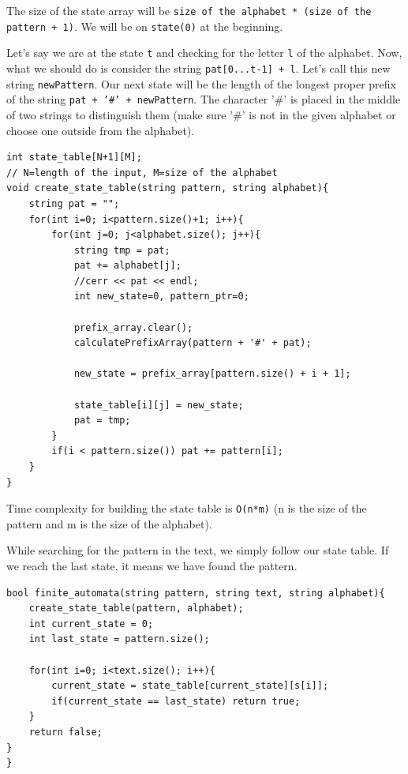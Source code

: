 \documentclass[12pt]{article}
\begin{document}
        The size of the state array will be \texttt{size of the alphabet * (size of the pattern + 1)}. We will be on \texttt{state(0)} at the beginning.
        
        Let's say we are at the state \texttt{t} and checking for the letter \texttt{l} of the alphabet. Now, what we should do is consider the string \texttt{pat[0...t-1] + l}. Let's call this new string \texttt{newPattern}. Our next state will be the length of the longest proper prefix of the string \texttt{pat + '#' + newPattern}. The character '#' is placed in the middle of two strings to distinguish them (make sure '#' is not in the given alphabet or choose one outside from the alphabet).
        
        \begin{verbatim}
int state_table[N+1][M];
// N=length of the input, M=size of the alphabet
void create_state_table(string pattern, string alphabet){
    string pat = "";
    for(int i=0; i<pattern.size()+1; i++){
        for(int j=0; j<alphabet.size(); j++){
            string tmp = pat;
            pat += alphabet[j];
            //cerr << pat << endl;
            int new_state=0, pattern_ptr=0;

            prefix_array.clear();
            calculatePrefixArray(pattern + '#' + pat);

            new_state = prefix_array[pattern.size() + i + 1];
            
            state_table[i][j] = new_state;
            pat = tmp;
        }
        if(i < pattern.size()) pat += pattern[i];
    }
}
        \end{verbatim}
        
        Time complexity for building the state table is \texttt{O(n*m)} (n is the size of the pattern and m is the size of the alphabet).
        
        \newpage
        
        While searching for the pattern in the text, we simply follow our state table. If we reach the last state, it means we have found the pattern.
        
        \begin{verbatim}
bool finite_automata(string pattern, string text, string alphabet){
    create_state_table(pattern, alphabet);
    int current_state = 0;
    int last_state = pattern.size();
    
    for(int i=0; i<text.size(); i++){
        current_state = state_table[current_state][s[i]];
        if(current_state == last_state) return true;
    }
    return false;
}
}
        \end{verbatim}
        
\end{document}
